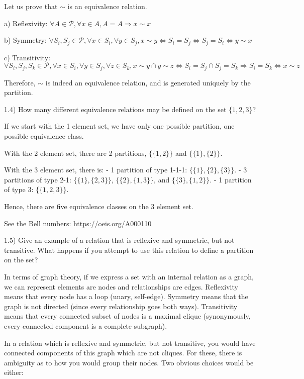 Let us prove that $\sim$ is an equivalence relation.

a) Reflexivity: $\forall A \in \mathcal{P}, \forall x \in A, A = A \Rightarrow x \sim x$

b) Symmetry: $\forall S_i, S_j \in \mathcal{P}, \forall x \in S_i, \forall y \in S_j, x \sim y \Leftrightarrow S_i = S_j \Leftrightarrow S_j = S_i \Leftrightarrow y \sim x$

c) Transitivity: $\forall S_i, S_j, S_k \in \mathcal{P}, \forall x \in S_i, \forall y \in S_j, \forall z \in S_k, x \sim y \cap y \sim z \Leftrightarrow S_i = S_j \cap S_j = S_k \Rightarrow S_i = S_k \Leftrightarrow x \sim z$

Therefore, $\sim$ is indeed an equivalence relation, and is generated uniquely by the partition.



1.4) How many different equivalence relations may be deﬁned on the set $\{1, 2, 3\}$?

If we start with the 1 element set, we have only one possible partition, one possible equivalence class.

With the 2 element set, there are 2 partitions, $\{\{1, 2\}\}$ and $\{\{1\}, \{2\}\}$.

With the 3 element set, there is:
- 1 partition of type 1-1-1: $\{\{1\}, \{2\}, \{3\}\}$.
- 3 partitions of type 2-1: $\{\{1\}, \{2, 3\}\}$, $\{\{2\}, \{1, 3\}\}$, and $\{\{3\}, \{1, 2\}\}$.
- 1 partition of type 3: $\{\{1, 2, 3\}\}$.

Hence, there are five equivalence classes on the 3 element set.

See the Bell numbers: https://oeis.org/A000110



1.5) Give an example of a relation that is reﬂexive and symmetric, but not transitive. What happens if you attempt to use this relation to deﬁne a partition on the set?

In terms of graph theory, if we express a set with an internal relation as a graph, we can represent elements are nodes and relationships are edges. Reflexivity means that every node has a loop (unary, self-edge). Symmetry means that the graph is not directed (since every relationship goes both ways). Transitivity means that every connected subset of nodes is a maximal clique (synonymously, every connected component is a complete subgraph).

In a relation which is reflexive and symmetric, but not transitive, you would have connected components of this graph which are not cliques. For these, there is ambiguity as to how you would group their nodes. Two obvious choices would be either:

